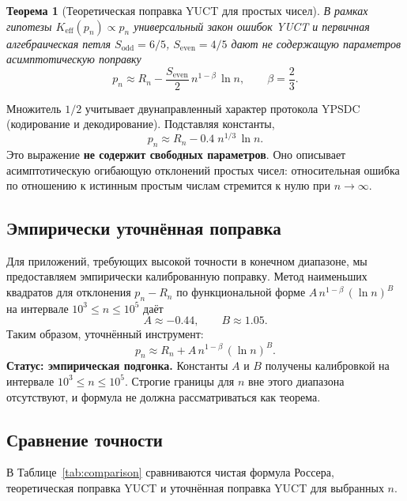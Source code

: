 \documentclass[12pt,a4paper]{article}
\newtheorem{theorem}{Теорема}[section]
\newcommand{\Sodd}{S_{\mathrm{odd}}}
\newcommand{\Seven}{S_{\mathrm{even}}}
\begin{document}
	\begin{theorem}[Теоретическая поправка YUCT для простых чисел]\label{thm:yuct-prime-theory}
		В рамках гипотезы \(K_{\mathrm{eff}}(p_n) \propto p_n\) универсальный закон ошибок YUCT и первичная алгебраическая петля \(\Sodd=6/5\), \(\Seven=4/5\) дают не содержащую параметров асимптотическую поправку
		\begin{equation}\label{eq:yuct-prime-theory}
			\boxed{ p_n \approx R_n - \frac{\Seven}{2}\, n^{1-\beta}\,\ln n },
			\qquad \beta = \frac{2}{3}.
		\end{equation}
	\end{theorem}
	
	Множитель \(1/2\) учитывает двунаправленный характер протокола YPSDC (кодирование и декодирование). Подставляя константы,
	\[
	p_n \approx R_n - 0.4\; n^{1/3}\,\ln n .
	\]
	Это выражение \textbf{не содержит свободных параметров}. Оно описывает асимптотическую огибающую отклонений простых чисел: относительная ошибка по отношению к истинным простым числам стремится к нулю при \(n\to\infty\).
	
	\subsection{Эмпирически уточнённая поправка}
	Для приложений, требующих высокой точности в конечном диапазоне, мы предоставляем эмпирически калиброванную поправку. Метод наименьших квадратов для отклонения \(p_n - R_n\) по функциональной форме \(A\,n^{1-\beta}\,(\ln n)^B\) на интервале \(10^3 \le n \le 10^5\) даёт
	\[
	A \approx -0.44, \qquad B \approx 1.05.
	\]
	Таким образом, уточнённый инструмент:
	\begin{equation}\label{eq:yuct-prime-empirical}
		\boxed{ p_n \approx R_n + A\,n^{1-\beta}\,(\ln n)^B }.
	\end{equation}
	\textbf{Статус: эмпирическая подгонка.} Константы \(A\) и \(B\) получены калибровкой на интервале \(10^3 \le n \le 10^5\). Строгие границы для \(n\) вне этого диапазона отсутствуют, и формула не должна рассматриваться как теорема.
	
	\subsection{Сравнение точности}
	В Таблице~\ref{tab:comparison} сравниваются чистая формула Россера, теоретическая поправка YUCT и уточнённая поправка YUCT для выбранных \(n\).
	
\end{document}
